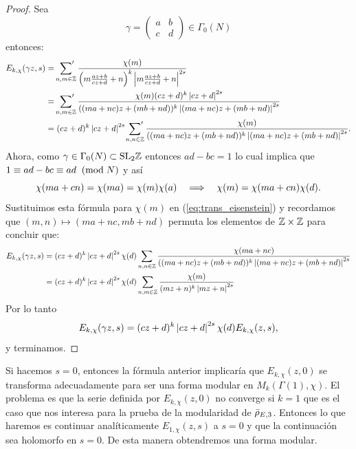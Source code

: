 \begin{proof}
Sea
\[
  \gamma=\begin{pmatrix}a & b\\ c&d\end{pmatrix} \in \Gamma_0(N)
\]
entonces:
\begin{align}
  E_{k,\chi}(\gamma z,s)&=
  \sideset{}{'}\sum_{n,m\in\ZZ}
  \frac{\chi(m)}{\paren{m\frac{az+b}{cz+d}+n}^k\abs{m\frac{az+b}{cz+d}+n}^{2s}}\nonumber\\ & =
  \sideset{}{'}\sum_{n,m\in\ZZ}%
  \frac{\chi(m)(cz+d)^k\abs{cz+d}^{2s}}{((ma+nc)z+(mb+nd))^k\abs{(ma+nc)z+(mb+nd)}^{2s}}\nonumber\\ & =
  (cz+d)^k\abs{cz+d}^{2s}\sideset{}{'}\sum_{n,n\in\ZZ}
  \frac{\chi(m)}{((ma+nc)z+(mb+nd))^k\abs{(ma+nc)z+(mb+nd)}^{2s}}.\label{eq:trans_eisenstein}
\end{align}
Ahora, como $\gamma\in\Gamma_0(N)\subset\mathrm{SL}_2\mathbb{Z}$ entonces $ad-bc=1$ lo cual implica que
$1\equiv ad-bc\equiv ad \;\;(\mathrm{mod}\; N)$ y as\'i
\[
\chi(ma+cn)=\chi(ma)=\chi(m)\chi(a) \quad\Longrightarrow\quad
\chi(m)=\chi(ma+cn)\chi(d).
\]
Sustituimos esta f\'ormula para $\chi(m)$ en (\ref{eq:trans_eisenstein}) y recordamos que
$(m,n)\mapsto(ma+nc,mb+nd)$ permuta los elementos de $\mathbb{Z}\times\mathbb{Z}$ para concluir que:
\begin{align*}
  E_{k,\chi}(\gamma z,s)&=
  (cz+d)^k\left| cz+d \right|^{2s}\chi(d)\sum_{n,n\in\mathbb{Z}}
  \frac{\chi(ma+nc)}{((ma+nc)z+(mb+nd))^k\left| (ma+nc)z+(mb+nd) \right|^{2s}} \\ & =
  (cz+d)^k\left| cz+d \right|^{2s}\chi(d)\sum_{n,m\in\mathbb{Z}}\frac{\chi(m)}{(mz+n)^{k}\left| mz+n \right|^{2s}}
\end{align*}
Por lo tanto
\begin{equation*}
  E_{k,\chi}(\gamma z,s) =(cz+d)^k\left| cz+d \right|^{2s}\chi(d) E_{k,\chi}(z,s),
\end{equation*}
y terminamos.
\end{proof}

Si hacemos $s=0$, entonces la f\'ormula anterior implicar\'ia que $E_{k,\chi}(z,0)$
se transforma adecuadamente para ser una forma modular en $M_k(\Gamma(1),\chi)$. El
problema es que la serie definida por $E_{k,\chi}(z,0)$ no converge si $k=1$ que es el
caso que nos interesa para la prueba de la modularidad de $\bar{\rho}_{E,3}$. Entonces lo que haremos
es continuar anal\'iticamente $E_{1,\chi}(z,s)$ a $s=0$ y que la continuaci\'on sea holomorfo
en $s=0$. De esta manera obtendremos una forma modular.

